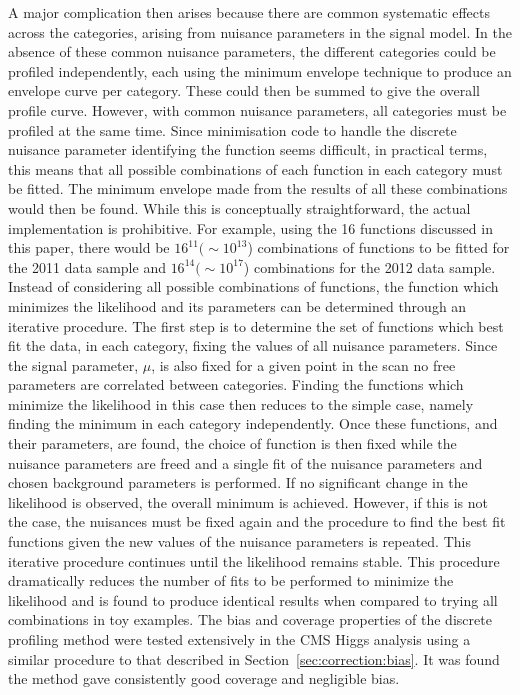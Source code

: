 A major complication then arises because there are common systematic effects
across the categories, arising from nuisance parameters in the signal
model.
In the absence of these common nuisance parameters,
the different categories could be profiled independently, each using the
minimum envelope technique to produce an envelope curve per category.
These could then
be summed to give the overall profile curve. However, with common
nuisance parameters, all categories must be profiled at the same time.
Since minimisation code to handle the 
discrete nuisance parameter identifying the
function seems difficult, in practical terms, this means that all possible
combinations of each function in each category must be fitted.
The minimum envelope made from the results of all these combinations would
then be found. While this is conceptually straightforward, the actual
implementation is prohibitive. For example, using the 16 functions
discussed in this paper, there would be $16^{11} (\sim 10^{13}$) combinations 
of functions to be fitted for the 2011 data sample and $16^{14} (\sim 10^{17}$)
combinations for the 2012 data sample.
Instead of considering all possible combinations of functions, the function 
which minimizes the likelihood and its parameters can be determined through 
an iterative procedure. The first step is to determine the set of functions 
which best fit the data, in each category, fixing the values of all nuisance 
parameters.
Since the signal parameter, $\mu$, is also fixed for a given point in the scan 
no free parameters are correlated between categories.
Finding the functions which minimize the likelihood in 
this case then reduces to the simple case, namely finding the minimum in each 
category independently. 
Once these functions, and their parameters, are found, the choice of function 
is then fixed while the nuisance parameters are freed and a single fit of the 
nuisance parameters and chosen background parameters is performed.
If no significant change in the likelihood is observed, the overall minimum is 
achieved. However, if this is not the case, the nuisances must be fixed again 
and the procedure to find the best fit functions given the new values of the 
nuisance parameters is repeated.
This iterative procedure continues until the likelihood remains stable.
This procedure dramatically reduces the number of fits to be performed 
to minimize the likelihood and is found to produce identical results when 
compared to trying all combinations in toy examples. 
The bias and coverage properties of the discrete profiling method were tested 
extensively in the CMS Higgs analysis using a similar procedure to that described in 
Section~\ref{sec:correction:bias}. It was found the method gave consistently good 
coverage and negligible bias.






